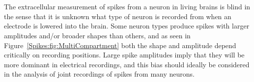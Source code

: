 \section{}
\label{Spikes:sec:spike-widths-amplitudes}
The extracellular measurement of spikes from a neuron in living brains is blind in the sense that it is
unknown what type of neuron is recorded from when an electrode is lowered into the brain.
Some neuron types produce spikes with larger amplitudes and/or broader shapes than
others, and as seen in Figure~\ref{Spikes:fig:MultiCompartment} both the shape and amplitude 
depend critically on recording positions. Large spike amplitudes imply that they will be more dominant in electrical recordings,
and this bias should ideally be considered in the analysis of joint recordings 
of spikes from many neurons.


